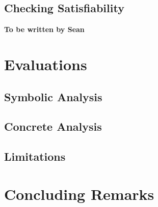 \documentclass{sig-alternate}
\begin{document}
\subsection{Checking Satisfiability}

\textbf{To be written by Sean}
\newpage



\section{Evaluations}

\subsection{Symbolic Analysis}

\subsection{Concrete Analysis}

\subsection{Limitations}



\section{Concluding Remarks}




\end{document}
